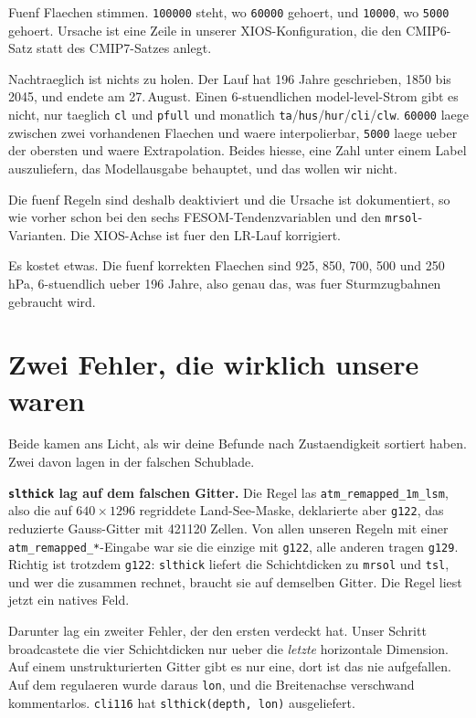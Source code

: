 \documentclass[11pt,a4paper]{article}
\newcommand{\code}[1]{\texttt{\small #1}}
\begin{document}
Fuenf Flaechen stimmen. \code{100000} steht, wo \code{60000} gehoert, und
\code{10000}, wo \code{5000} gehoert. Ursache ist eine Zeile in unserer
XIOS-Konfiguration, die den CMIP6-Satz statt des CMIP7-Satzes anlegt.

Nachtraeglich ist nichts zu holen. Der Lauf hat 196 Jahre geschrieben, 1850 bis
2045, und endete am 27.\,August. Einen 6-stuendlichen model-level-Strom gibt
es nicht, nur taeglich \code{cl} und \code{pfull} und monatlich
\code{ta}/\code{hus}/\code{hur}/\code{cli}/\code{clw}. \code{60000} laege
zwischen zwei vorhandenen Flaechen und waere interpolierbar, \code{5000} laege
ueber der obersten und waere Extrapolation. Beides hiesse, eine Zahl unter
einem Label auszuliefern, das Modellausgabe behauptet, und das wollen wir
nicht.

Die fuenf Regeln sind deshalb deaktiviert und die Ursache ist dokumentiert, so
wie vorher schon bei den sechs FESOM-Tendenzvariablen und den
\code{mrsol}-Varianten. Die XIOS-Achse ist fuer den LR-Lauf korrigiert.

Es kostet etwas. Die fuenf korrekten Flaechen sind 925, 850, 700, 500 und
250\,hPa, 6-stuendlich ueber 196 Jahre, also genau das, was fuer Sturmzugbahnen
gebraucht wird.

\section{Zwei Fehler, die wirklich unsere waren}

Beide kamen ans Licht, als wir deine Befunde nach Zustaendigkeit sortiert haben.
Zwei davon lagen in der falschen Schublade.

\textbf{\code{slthick} lag auf dem falschen Gitter.} Die Regel las
\code{atm\_remapped\_1m\_lsm}, also die auf $640 \times 1296$ regriddete
Land-See-Maske, deklarierte aber \code{g122}, das reduzierte Gauss-Gitter mit
421120 Zellen. Von allen unseren Regeln mit einer \code{atm\_remapped\_*}-Eingabe war
sie die einzige mit \code{g122}, alle anderen tragen \code{g129}. Richtig ist
trotzdem \code{g122}: \code{slthick} liefert die Schichtdicken zu \code{mrsol} und
\code{tsl}, und wer die zusammen rechnet, braucht sie auf demselben Gitter. Die
Regel liest jetzt ein natives Feld.

Darunter lag ein zweiter Fehler, der den ersten verdeckt hat. Unser Schritt
broadcastete die vier Schichtdicken nur ueber die \emph{letzte} horizontale
Dimension. Auf einem unstrukturierten Gitter gibt es nur eine, dort ist das nie
aufgefallen. Auf dem regulaeren wurde daraus \code{lon}, und die Breitenachse
verschwand kommentarlos. \code{cli116} hat \code{slthick(depth, lon)} ausgeliefert.
\end{document}
